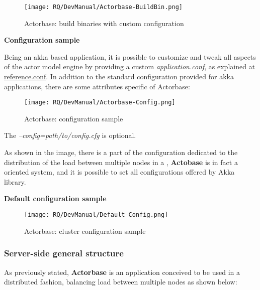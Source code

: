 \documentclass{scalatekids-article}
\begin{document}
\begin{figure}[H]
  \begin{center}
    \texttt{[image: RQ/DevManual/Actorbase-BuildBin.png]}
    \caption{Actorbase: build binaries with custom configuration}
  \end{center}
\end{figure}

\textbf{Configuration sample}

Being an akka based application, it is possible to customize and tweak all
aspects of the actor model engine by providing a custom \textit{application.conf}, as
explained at
\href{http://doc.akka.io/docs/akka/2.4.7/general/configuration.html#Listing_of_the_Reference_Configuration}{reference.conf}.
In addition to the standard configuration provided for akka applications, there are some attributes specific
of Actorbase:

\begin{figure}[H]
  \begin{center}
    \texttt{[image: RQ/DevManual/Actorbase-Config.png]}
    \caption{Actorbase: configuration sample}
  \end{center}
\end{figure}

The \textit{--config=path/to/config.cfg} is optional.

As shown in the image, there is a part of the configuration dedicated to the
distribution of the load between multiple nodes in a , \textbf{Actobase} is in fact a
 oriented system, and it is possible to set all
 configurations offered by Akka library.

\textbf{Default configuration sample}

\begin{figure}[H]
  \begin{center}
    \texttt{[image: RQ/DevManual/Default-Config.png]}
    \caption{Actorbase: cluster configuration sample}
  \end{center}
\end{figure}

\newpage
\subsubsection{Server-side general structure}

As previously stated, \textbf{Actorbase} is an application conceived to be used in a distributed fashion,
balancing load between multiple nodes as shown below:
\end{document}
